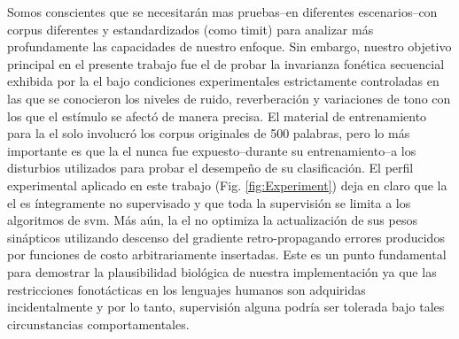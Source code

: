 {Somos conscientes que se necesitarán mas pruebas--en diferentes escenarios--con corpus diferentes y estandardizados (como \gls{timit}) para analizar más profundamente las capacidades de nuestro enfoque.
Sin embargo, nuestro objetivo principal en el presente trabajo fue el de probar la invarianza fonética secuencial exhibida por la \gls{el} bajo condiciones experimentales estrictamente controladas en las que se conocieron los niveles de ruido, reverberación y variaciones de tono con los que el estímulo se afectó de manera precisa. El material de entrenamiento para la \gls{el} solo involucró los corpus originales de 500 palabras, pero lo más importante es que la \gls{el} nunca fue expuesto--durante su entrenamiento--a los disturbios utilizados para probar el desempeño de su clasificación. El perfil experimental aplicado en este trabajo (Fig. \ref{fig:Experiment}) deja en claro que la \gls{el} es íntegramente no supervisado y que toda la supervisión se limita a los algoritmos de \gls{svm}. Más aún, la \gls{el} no optimiza la actualización de sus pesos sinápticos utilizando descenso del gradiente retro-propagando errores producidos por funciones de costo arbitrariamente insertadas. Este es un punto fundamental para demostrar la plausibilidad biológica de nuestra implementación ya que las restricciones fonotácticas en los  lenguajes humanos son adquiridas incidentalmente \cite{BRENT199693,saffran_1997} y por lo tanto, supervisión alguna podría ser tolerada bajo tales circunstancias comportamentales.

}
